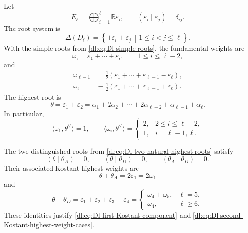 \documentclass[11pt,reqno]{amsart}
\theoremstyle{definition}
\theoremstyle{remark}
\begin{document}
Let
\[
  E_\ell
  =
  \bigoplus_{i=1}^{\ell}\mathbb R\varepsilon_i,
  \qquad
  (\varepsilon_i\mid\varepsilon_j)=\delta_{ij}.
\]
The root system is
\begin{equation*}
  \Delta(D_\ell)
  =
  \left\{
    \pm\varepsilon_i\pm\varepsilon_j
    \,\middle|\,
    1\le i<j\le\ell
  \right\}.
\end{equation*}
With the simple roots from
\eqref{dl:eq:Dl-simple-roots}, the fundamental weights are
\begin{equation*}
  \omega_i
  =
  \varepsilon_1+\cdots+\varepsilon_i,
  \qquad
  1\le i\le\ell-2,
\end{equation*}
and
\begin{equation*}
\begin{aligned}
  \omega_{\ell-1}
  &=
  \frac12
  \left(
    \varepsilon_1+\cdots+\varepsilon_{\ell-1}
    -\varepsilon_\ell
  \right),\\
  \omega_\ell
  &=
  \frac12
  \left(
    \varepsilon_1+\cdots+\varepsilon_{\ell-1}
    +\varepsilon_\ell
  \right).
\end{aligned}
\end{equation*}
The highest root is
\begin{equation*}
  \theta
  =
  \varepsilon_1+\varepsilon_2
  =
  \alpha_1+2\alpha_2+\cdots+
  2\alpha_{\ell-2}+\alpha_{\ell-1}+\alpha_\ell.
\end{equation*}
In particular,
\begin{equation*}
  \langle\omega_1,\theta^\vee\rangle=1,
  \qquad
  \langle\omega_i,\theta^\vee\rangle
  =
  \begin{cases}
    2,&2\le i\le\ell-2,\\
    1,&i=\ell-1,\ell.
  \end{cases}
\end{equation*}

The two distinguished roots from
\eqref{dl:eq:Dl-two-natural-highest-roots} satisfy
\begin{equation*}
  (\theta\mid\theta_A)=0,
  \qquad
  (\theta\mid\theta_D)=0,
  \qquad
  (\theta_A\mid\theta_D)=0.
\end{equation*}
Their associated Kostant highest weights are
\begin{equation*}
  \theta+\theta_A
  =
  2\varepsilon_1
  =
  2\omega_1
\end{equation*}
and
\begin{equation*}
  \theta+\theta_D
  =
  \varepsilon_1+\varepsilon_2+\varepsilon_3+\varepsilon_4
  =
  \begin{cases}
    \omega_4+\omega_5,&\ell=5,\\
    \omega_4,&\ell\ge6.
  \end{cases}
\end{equation*}
These identities justify
\eqref{dl:eq:Dl-first-Kostant-component} and
\eqref{dl:eq:Dl-second-Kostant-highest-weight-cases}.
\end{document}
